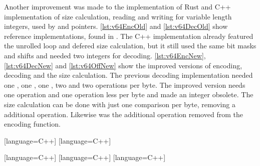 \documentclass[thesis]{subfiles}
\begin{document}
  Another improvement was made to the implementation of Rust and C++ implementation of size calculation, reading and writing for variable length integers, used by  and pointers.
  \autoref{lst:v64EncOld} and \autoref{lst:v64DecOld} show reference implementations, found in \autocite{skill-tr}.
  The C++ implementation already featured the unrolled loop and defered size calculation, but it still used the same bit masks and shifts and needed two integers for decoding.
  \autoref{lst:v64EncNew}, \autoref{lst:v64DecNew} and \autoref{lst:v64OffNew} show the improved versions of encoding, decoding and the size calculation.
  The previous decoding implementation needed one , one , one , two  and two  operations per byte.
  The improved version needs one  operation and one  operation less per byte and made an integer obsolete.
  The size calculation can be done with just one comparison per byte, removing a additional  operation.
  Likewise was the additional  operation removed from the encoding function.

  [language=C++]
  [language=C++]

  [language=C++]
  [language=C++]
  [language=C++]
\end{document}
